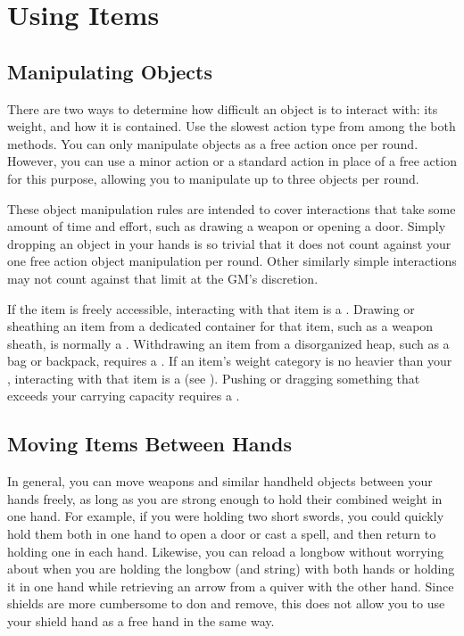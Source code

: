 \section{Using Items}

  \subsection{Manipulating Objects}\label{Manipulating Objects}
    There are two ways to determine how difficult an object is to interact with: its weight, and how it is contained.
    Use the slowest action type from among the both methods.
    You can only manipulate objects as a free action once per round.
    However, you can use a minor action or a standard action in place of a free action for this purpose, allowing you to manipulate up to three objects per round.

    These object manipulation rules are intended to cover interactions that take some amount of time and effort, such as drawing a weapon or opening a door.
    Simply dropping an object in your hands is so trivial that it does not count against your one free action object manipulation per round.
    Other similarly simple interactions may not count against that limit at the GM's discretion.

    \begin{raggeditemize}
       If the item is freely accessible, interacting with that item is a .
        Drawing or sheathing an item from a dedicated container for that item, such as a weapon sheath, is normally a .
        Withdrawing an item from a disorganized heap, such as a bag or backpack, requires a .
       If an item's weight category is no heavier than your , interacting with that item is a  (see ).
        Pushing or dragging something that exceeds your carrying capacity requires a .
    \end{raggeditemize}

  \subsection{Moving Items Between Hands}\label{Moving Items Between Hands}
    In general, you can move weapons and similar handheld objects between your hands freely, as long as you are strong enough to hold their combined weight in one hand.
    For example, if you were holding two short swords, you could quickly hold them both in one hand to open a door or cast a spell, and then return to holding one in each hand.
    Likewise, you can reload a longbow without worrying about when you are holding the longbow (and string) with both hands or holding it in one hand while retrieving an arrow from a quiver with the other hand.
    Since shields are more cumbersome to don and remove, this does not allow you to use your shield hand as a free hand in the same way.

